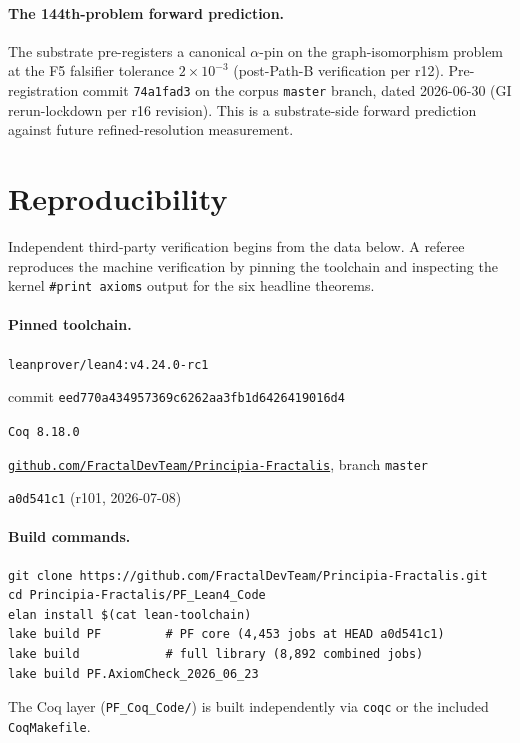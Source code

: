 \documentclass[11pt,a4paper]{amsart}
\theoremstyle{plain}
\theoremstyle{definition}
\begin{document}
\paragraph{The 144th-problem forward prediction.} The substrate pre-registers a canonical $\alpha$-pin on the graph-isomorphism problem at the F5 falsifier tolerance $2 \times 10^{-3}$ (post-Path-B verification per r12). Pre-registration commit \texttt{74a1fad3} on the corpus \texttt{master} branch, dated 2026-06-30 (GI rerun-lockdown per r16 revision). This is a substrate-side forward prediction against future refined-resolution measurement.

\section{Reproducibility}\label{sec:reproducibility}

Independent third-party verification begins from the data below. A referee reproduces the machine verification by pinning the toolchain and inspecting the kernel \texttt{\#print axioms} output for the six headline theorems.

\paragraph{Pinned toolchain.}
\begin{description}[font=\normalfont\bfseries,leftmargin=2em,itemsep=2pt]
\item[Lean toolchain] \texttt{leanprover/lean4:v4.24.0-rc1}
\item[mathlib revision] commit \texttt{eed770a434957369c6262aa3fb1d6426419016d4}
\item[Coq version] \texttt{Coq 8.18.0}
\item[Repository] \href{https://github.com/FractalDevTeam/Principia-Fractalis}{\texttt{github.com/FractalDevTeam/Principia-Fractalis}}, branch \texttt{master}
\item[HEAD reference at submission] \texttt{a0d541c1} (r101, 2026-07-08)
\end{description}

\paragraph{Build commands.}
\begin{verbatim}
git clone https://github.com/FractalDevTeam/Principia-Fractalis.git
cd Principia-Fractalis/PF_Lean4_Code
elan install $(cat lean-toolchain)
lake build PF         # PF core (4,453 jobs at HEAD a0d541c1)
lake build            # full library (8,892 combined jobs)
lake build PF.AxiomCheck_2026_06_23
\end{verbatim}
The Coq layer (\texttt{PF\_Coq\_Code/}) is built independently via \texttt{coqc} or the included \texttt{CoqMakefile}.
\end{document}
